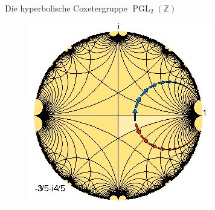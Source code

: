 \documentclass[pdf]{beamer}
\newcommand{\op}[1]{\operatorname{#1}}
\newcommand{\bbf}[1]{\mathds{#1}}
\newcommand{\Z}{\bbf{Z}}
\begin{document}
\begin{frame}{Die hyperbolische Coxetergruppe $\op{PGL}_2(\Z)$}
   \begin{figure}
      \centering%
      \includegraphics[width=.8\textwidth]{graphics/hyperbolic-orientation.eps}%
   \end{figure}
\end{frame}
\end{document}
